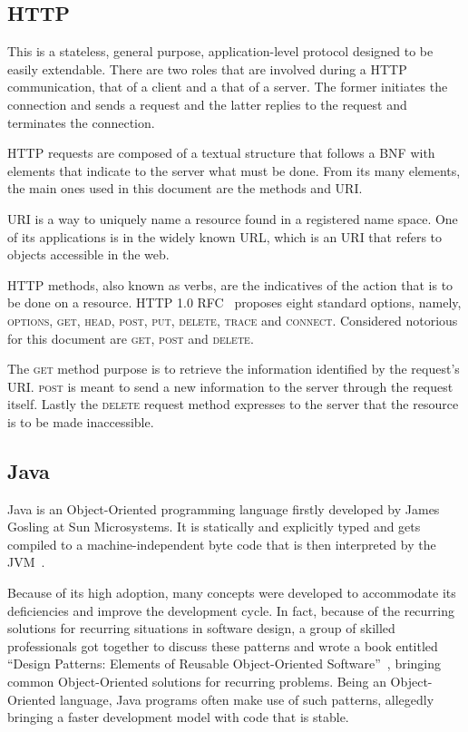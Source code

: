 \subsection{HTTP}
This is a stateless, general purpose, application-level protocol designed to be easily extendable. There are two roles that are involved during a \gls{HTTP} communication, that of a client and a that of a server. The former initiates the connection and sends a request and the latter replies to the request and terminates the connection.

\gls{HTTP} requests are composed of a textual structure that follows a \gls{BNF} with elements that indicate to the server what must be done. From its many elements, the main ones used in this document are the methods and \gls{URI}.

\gls{URI} is a way to uniquely name a resource found in a registered name space. One of its applications is in the widely known \gls{URL}, which is an \gls{URI} that refers to objects accessible in the web.

\gls{HTTP} methods, also known as verbs, are the indicatives of the action that is to be done on a resource. \gls{HTTP} 1.0 \gls{RFC}~\cite{http} proposes eight standard options, namely, \textsc{options}, \textsc{get}, \textsc{head}, \textsc{post}, \textsc{put}, \textsc{delete}, \textsc{trace} and \textsc{connect}. Considered notorious for this document are \textsc{get}, \textsc{post} and \textsc{delete}.

The \textsc{get} method purpose is to retrieve the information identified by the request's \gls{URI}. \textsc{post} is meant to send a new information to the server through the request itself. Lastly the \textsc{delete} request method expresses to the server that the resource is to be made inaccessible.

\subsection{Java}
Java is an Object-Oriented programming language firstly developed by James Gosling at Sun Microsystems. It is statically and explicitly typed and gets compiled to a machine-independent byte code that is then interpreted by the \gls{JVM}~\cite{java}.

Because of its high adoption, many concepts were developed to accommodate its deficiencies and improve the development cycle. In fact, because of the recurring solutions for recurring situations in software design, a group of skilled professionals got together to discuss these patterns and wrote a book entitled ``Design Patterns: Elements of Reusable Object-Oriented Software''~\cite{patterns}, bringing common Object-Oriented solutions for recurring problems. Being an Object-Oriented language, Java programs often make use of such patterns, allegedly bringing a faster development model with code that is stable.

